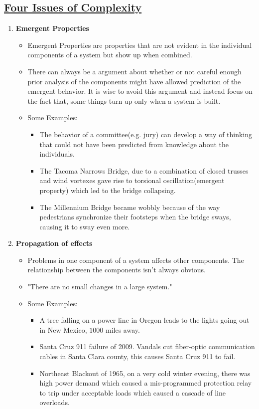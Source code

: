 \documentclass{article}
\begin{document}
\subsection*{\underline{Four Issues of Complexity}}

\begin{enumerate}
    \item \textbf{Emergent Properties}
    \begin{itemize}
        \item Emergent Properties are properties that are not evident in the individual components of a system but show up when combined.
        \item There can always be a argument about whether or not careful enough prior analysis of the components might have allowed prediction of the emergent behavior. It is wise to avoid this argument and instead focus on the fact that, some things turn up only when a system is built.
        \item [] Some Examples:
        \begin{itemize}
            \item The behavior of a committee(e.g. jury) can develop a way of thinking that could not have been predicted from knowledge about the individuals.
            \item The Tacoma Narrows Bridge, due to a combination of closed trusses and wind vortexes gave rise to torsional oscillation(emergent property) which led to the bridge collapsing.
            \item The Millennium Bridge became wobbly because of the way pedestrians synchronize their footsteps when the bridge sways, causing it to sway even more.
        \end{itemize} 
    \end{itemize}
    \item \textbf{Propagation of effects}
    \begin{itemize}
        \item Problems in one component of a system affects other components. The relationship between the components isn't always obvious.
        \item "There are no small changes in a large system."
        \item [] Some Examples:
        \begin{itemize}
            \item A tree falling on a power line in Oregon leads to the lights going out in New Mexico, $1000$ miles away.
            \item Santa Cruz 911 failure of 2009. Vandals cut fiber-optic communication cables in Santa Clara county, this causes Santa Cruz 911 to fail.
            \item Northeast Blackout of 1965, on a very cold winter evening, there was high power demand which caused a mis-programmed protection relay to trip under acceptable loads which caused a cascade of line overloads.
        \end{itemize}


\end{itemize}
\end{enumerate}
\end{document}
